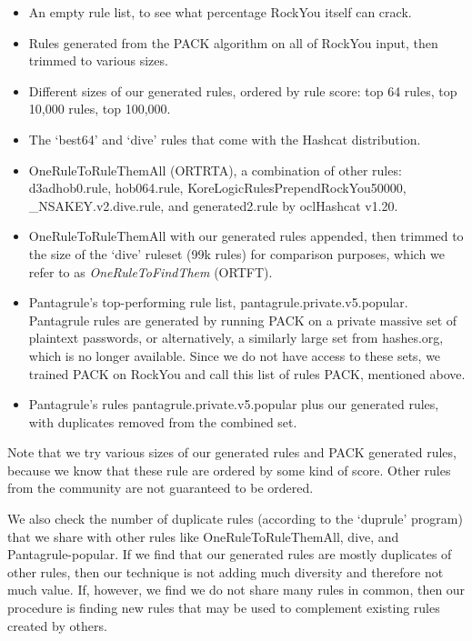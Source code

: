 \documentclass{article}
\begin{document}
\begin{itemize}

\item An empty rule list, to see what percentage RockYou itself can crack.

\item Rules generated from the PACK algorithm\autocite{PACK} on all of RockYou
input, then trimmed to various sizes.

\item Different sizes of our generated rules, ordered by rule score: top
64 rules, top 10,000 rules, top 100,000.

\item The `best64' and `dive' rules that come with the Hashcat distribution.

\item OneRuleToRuleThemAll (ORTRTA)\autocite{ortrta}, a combination of other rules:
d3adhob0.rule, hob064.rule, KoreLogicRulesPrependRockYou50000,\newline
\_NSAKEY.v2.dive.rule, and generated2.rule by oclHashcat v1.20.

\item OneRuleToRuleThemAll with our generated rules appended, then trimmed to
the size of the `dive' ruleset (99k rules) for comparison purposes, which we
refer to as \textit{OneRuleToFindThem} (ORTFT).

\item Pantagrule's\autocite{pantagrule} top-performing rule list,
pantagrule.private.v5.popular. Pantagrule rules are generated by running PACK
on a private massive set of plaintext passwords, or alternatively, a similarly
large set from hashes.org, which is no longer available. Since we do not have
access to these sets, we trained PACK on RockYou and call this list of rules
PACK, mentioned above.

\item Pantagrule's rules pantagrule.private.v5.popular plus our generated rules,
with duplicates removed from the combined set.

\end{itemize}

Note that we try various sizes of our generated rules and PACK generated rules,
because we know that these rule are ordered by some kind of score. Other
rules from the community are not guaranteed to be ordered.

We also check the number of duplicate rules (according to the `duprule'
program\autocite{duprule}) that we share with other rules like
OneRuleToRuleThemAll, dive, and Pantagrule-popular. If we find that our
generated rules are mostly duplicates of other rules, then our technique is not
adding much diversity and therefore not much value. If, however, we find we do
not share many rules in common, then our procedure is finding new rules that
may be used to complement existing rules created by others.
\end{document}
